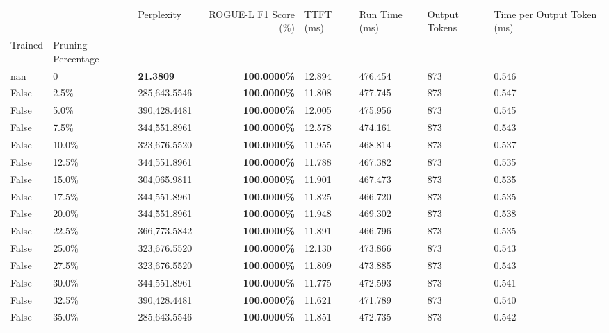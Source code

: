 \begin{table}[H]
{\label{tab:evaluation-pipeline-6-untrained}
\begin{tabular}{lllrllll}
\toprule
 &  & Perplexity & ROGUE-L F1 Score (\%) & TTFT (ms) & Run Time (ms) & Output Tokens & Time per Output Token (ms) \\
Trained & Pruning Percentage &  &  &  &  &  &  \\
\midrule
nan & 0 & \bfseries 21.3809 & \bfseries 100.0000\% & 12.894 & 476.454 & 873 & 0.546 \\
\cline{1-8}
False & 2.5\% & 285,643.5546 & \bfseries \color{red} 100.0000\% & 11.808 & 477.745 & 873 & 0.547 \\
\cline{1-8}
False & 5.0\% & 390,428.4481 & \bfseries \color{red} 100.0000\% & 12.005 & 475.956 & 873 & 0.545 \\
\cline{1-8}
False & 7.5\% & 344,551.8961 & \bfseries \color{red} 100.0000\% & 12.578 & 474.161 & 873 & 0.543 \\
\cline{1-8}
False & 10.0\% & 323,676.5520 & \bfseries \color{red} 100.0000\% & 11.955 & 468.814 & 873 & 0.537 \\
\cline{1-8}
False & 12.5\% & 344,551.8961 & \bfseries \color{red} 100.0000\% & 11.788 & 467.382 & 873 & 0.535 \\
\cline{1-8}
False & 15.0\% & 304,065.9811 & \bfseries \color{red} 100.0000\% & 11.901 & 467.473 & 873 & 0.535 \\
\cline{1-8}
False & 17.5\% & 344,551.8961 & \bfseries \color{red} 100.0000\% & 11.825 & 466.720 & 873 & 0.535 \\
\cline{1-8}
False & 20.0\% & 344,551.8961 & \bfseries \color{red} 100.0000\% & 11.948 & 469.302 & 873 & 0.538 \\
\cline{1-8}
False & 22.5\% & 366,773.5842 & \bfseries \color{red} 100.0000\% & 11.891 & 466.796 & 873 & 0.535 \\
\cline{1-8}
False & 25.0\% & 323,676.5520 & \bfseries \color{red} 100.0000\% & 12.130 & 473.866 & 873 & 0.543 \\
\cline{1-8}
False & 27.5\% & 323,676.5520 & \bfseries \color{red} 100.0000\% & 11.809 & 473.885 & 873 & 0.543 \\
\cline{1-8}
False & 30.0\% & 344,551.8961 & \bfseries \color{red} 100.0000\% & 11.775 & 472.593 & 873 & 0.541 \\
\cline{1-8}
False & 32.5\% & 390,428.4481 & \bfseries \color{red} 100.0000\% & 11.621 & 471.789 & 873 & 0.540 \\
\cline{1-8}
False & 35.0\% & 285,643.5546 & \bfseries \color{red} 100.0000\% & 11.851 & 472.735 & 873 & 0.542 \\

\end{tabular}}
\end{table}
